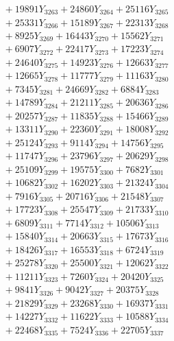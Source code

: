 \documentclass[a4paper,10pt]{article}
\begin{document}
{\begin{align}
&\;  + 19891 Y_{3263} + 24860 Y_{3264} + 25116 Y_{3265} \\[0.3ex]
&\;  + 25331 Y_{3266} + 15189 Y_{3267} + 22313 Y_{3268} \\[0.5ex]\allowbreak
&\;  + 8925 Y_{3269} + 16443 Y_{3270} + 15562 Y_{3271} \\[0.3ex]
&\;  + 6907 Y_{3272} + 22417 Y_{3273} + 17223 Y_{3274} \\[0.3ex]
&\;  + 24640 Y_{3275} + 14923 Y_{3276} + 12663 Y_{3277} \\[0.3ex]
&\;  + 12665 Y_{3278} + 11777 Y_{3279} + 11163 Y_{3280} \\[0.3ex]
&\;  + 7345 Y_{3281} + 24669 Y_{3282} + 6884 Y_{3283} \\[0.3ex]
&\;  + 14789 Y_{3284} + 21211 Y_{3285} + 20636 Y_{3286} \\[0.3ex]
&\;  + 20257 Y_{3287} + 11835 Y_{3288} + 15466 Y_{3289} \\[0.3ex]
&\;  + 13311 Y_{3290} + 22360 Y_{3291} + 18008 Y_{3292} \\[0.3ex]
&\;  + 25124 Y_{3293} + 9114 Y_{3294} + 14756 Y_{3295} \\[0.3ex]
&\;  + 11747 Y_{3296} + 23796 Y_{3297} + 20629 Y_{3298} \\[0.5ex]\allowbreak
&\;  + 25109 Y_{3299} + 19575 Y_{3300} + 7682 Y_{3301} \\[0.3ex]
&\;  + 10682 Y_{3302} + 16202 Y_{3303} + 21324 Y_{3304} \\[0.3ex]
&\;  + 7916 Y_{3305} + 20716 Y_{3306} + 21548 Y_{3307} \\[0.3ex]
&\;  + 17723 Y_{3308} + 25547 Y_{3309} + 21733 Y_{3310} \\[0.3ex]
&\;  + 6809 Y_{3311} + 7714 Y_{3312} + 10506 Y_{3313} \\[0.3ex]
&\;  + 15840 Y_{3314} + 20663 Y_{3315} + 17673 Y_{3316} \\[0.3ex]
&\;  + 18426 Y_{3317} + 16553 Y_{3318} + 6724 Y_{3319} \\[0.3ex]
&\;  + 25278 Y_{3320} + 25500 Y_{3321} + 12062 Y_{3322} \\[0.3ex]
&\;  + 11211 Y_{3323} + 7260 Y_{3324} + 20420 Y_{3325} \\[0.3ex]
&\;  + 9841 Y_{3326} + 9042 Y_{3327} + 20375 Y_{3328} \\[0.5ex]\allowbreak
&\;  + 21829 Y_{3329} + 23268 Y_{3330} + 16937 Y_{3331} \\[0.3ex]
&\;  + 14227 Y_{3332} + 11622 Y_{3333} + 10588 Y_{3334} \\[0.3ex]
&\;  + 22468 Y_{3335} + 7524 Y_{3336} + 22705 Y_{3337} \\[0.3ex]

\end{align}}
\end{document}
